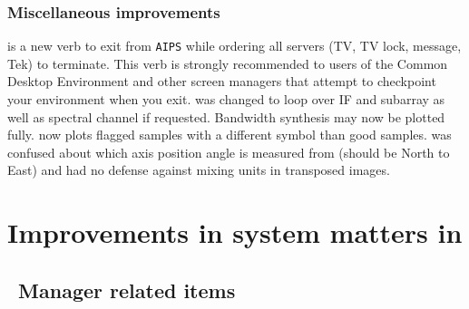 \subsubsection{Miscellaneous improvements}

\begin{description}
 is a new verb to exit from {\tt AIPS} while ordering
   all servers (TV, TV lock, message, Tek) to terminate.  This verb is
   strongly recommended to users of the Common Desktop Environment and
   other screen managers that attempt to checkpoint your environment
   when you exit.
 was changed to loop over IF and subarray as well as
   spectral channel if requested.  Bandwidth synthesis may now be
   plotted fully.
 now plots flagged samples with a different symbol than
   good samples.
 was confused about which axis position angle is
   measured from (should be North to East) and had no defense against
   mixing units in transposed images.
\end{description}

\section{Improvements in system matters in \RELEASENAME}

\subsection{\AIPS\ Manager related items}

